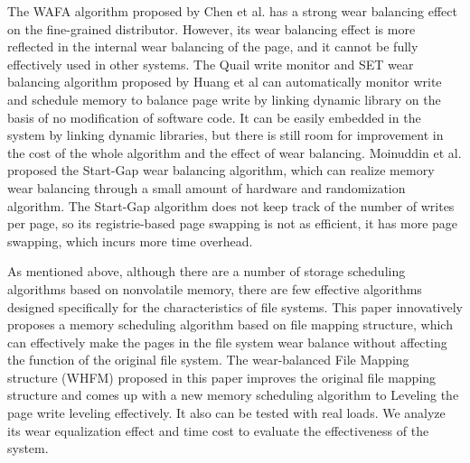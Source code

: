\documentclass[twocolumn]{article}
\begin{document}
	The WAFA algorithm proposed by Chen et al. has a strong wear balancing effect on the fine-grained distributor. However, its wear balancing effect is more reflected in the internal wear balancing of the page, and it cannot be fully effectively used in other systems. The Quail write monitor and SET wear balancing algorithm proposed by Huang et al can automatically monitor write and schedule memory to balance page write by linking dynamic library on the basis of no modification of software code. It can be easily embedded in the system by linking dynamic libraries, but there is still room for improvement in the cost of the whole algorithm and the effect of wear balancing. Moinuddin et al. proposed the Start-Gap wear balancing algorithm, which can realize memory wear balancing through a small amount of hardware and randomization algorithm. The Start-Gap algorithm does not keep track of the number of writes per page, so its registrie-based page swapping is not as efficient, it has more page swapping, which incurs more time overhead.
	
	As mentioned above, although there are a number of storage scheduling algorithms based on nonvolatile memory, there are few effective algorithms designed specifically for the characteristics of file systems. This paper innovatively proposes a memory scheduling algorithm based on file mapping structure, which can effectively make the pages in the file system wear balance without affecting the function of the original file system. The wear-balanced File Mapping structure (WHFM) proposed in this paper improves the original file mapping structure and comes up with a new memory scheduling algorithm to Leveling the page write leveling effectively. It also can be tested with real loads. We analyze its wear equalization effect and time cost to evaluate the effectiveness of the system.
\end{document}
